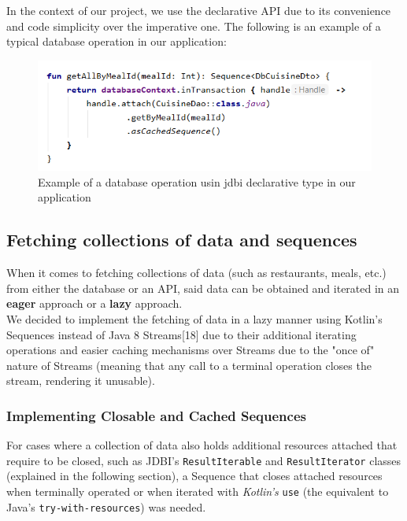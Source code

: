 In the context of our project, we use the declarative API due to its convenience and code simplicity over the
imperative one. The following is an example of a typical database operation in our application:\

\begin{figure}[H]
    \begin{center}
        \includegraphics[scale=0.8]{_figures/jdbi-nutrio.png}
        \caption{Example of a database operation usin jdbi declarative type in our application}
    \end{center}
\end{figure}

\subsection{Fetching collections of data and sequences}

When it comes to fetching collections of data (such as restaurants, meals, etc.) from either the database or an API, said data can be obtained
and iterated in an \textbf{eager} approach or a \textbf{lazy} approach.\\

We decided to implement the fetching of data in a lazy manner using Kotlin’s Sequences\cite{sequences}
instead of Java 8 Streams[18] due to their additional iterating operations and easier caching mechanisms over Streams due to the "once of" nature
of Streams (meaning that any call to a terminal operation closes the stream, rendering it unusable).\\

\subsubsection{Implementing Closable and Cached Sequences}

For cases where a collection of data also holds additional resources attached that require to be closed,
such as JDBI's \texttt{ResultIterable} and \texttt{ResultIterator} classes (explained in the following section),
a Sequence that closes attached resources when terminally operated or when iterated with \textit{Kotlin's} \texttt{use}
(the equivalent to Java's \texttt{try-with-resources}) was needed.\\

